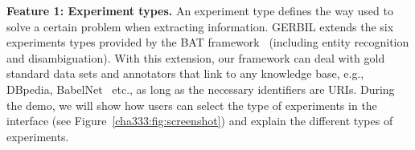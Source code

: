 \textbf{Feature 1: Experiment types.}
An experiment type defines the way used to solve a certain problem when extracting information.
GERBIL extends the six experiments types provided by the BAT framework~\cite{cornolti} (including entity recognition and disambiguation). 
With this extension, our framework can deal with gold standard data sets and annotators that link to any knowledge base, e.g., DBpedia, BabelNet~\cite{NavigliPonzetto:12aij} etc., as long as the necessary identifiers are URIs. During the demo, we will show how users can select the type of experiments in the interface (see Figure~\ref{cha333:fig:screenshot}) and explain the different types of experiments.\newline


